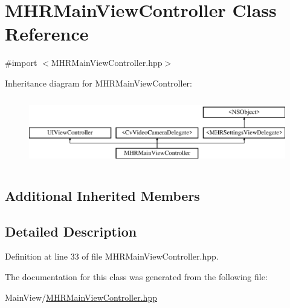 \hypertarget{interface_m_h_r_main_view_controller}{\section{M\+H\+R\+Main\+View\+Controller Class Reference}
\label{interface_m_h_r_main_view_controller}
}


{\ttfamily \#import $<$M\+H\+R\+Main\+View\+Controller.\+hpp$>$}

Inheritance diagram for M\+H\+R\+Main\+View\+Controller\+:\begin{figure}[H]
\begin{center}
\leavevmode
\includegraphics[height=3.000000cm]{interface_m_h_r_main_view_controller}
\end{center}
\end{figure}
\subsection*{Additional Inherited Members}


\subsection{Detailed Description}


Definition at line 33 of file M\+H\+R\+Main\+View\+Controller.\+hpp.



The documentation for this class was generated from the following file\+:\begin{DoxyCompactItemize}
\item 
Main\+View/\hyperlink{_m_h_r_main_view_controller_8hpp}{M\+H\+R\+Main\+View\+Controller.\+hpp}\end{DoxyCompactItemize}
